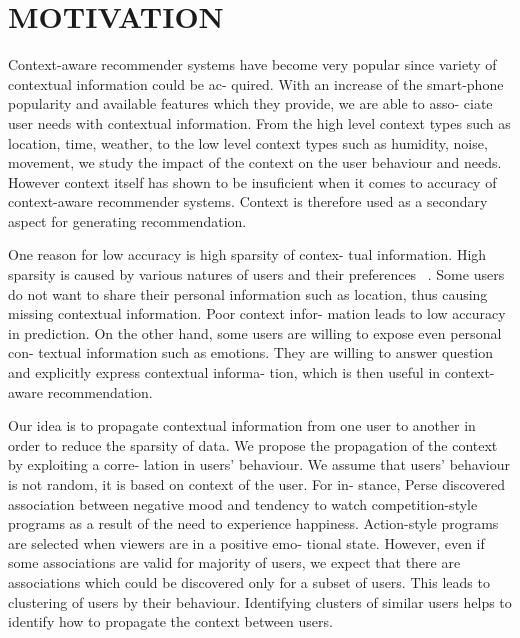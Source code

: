 \documentclass{acm_proc_article-sp}
\begin{document}



\section{MOTIVATION}
Context-aware recommender systems have become very
popular since variety of contextual information could be ac-
quired. With an increase of the smart-phone popularity and
available features which they provide, we are able to asso-
ciate user needs with contextual information. From the high
level context types such as location, time, weather, to the
low level context types such as humidity, noise, movement,
we study the impact of the context on the user behaviour and
needs. However context itself has shown to be insuficient
when it comes to accuracy of context-aware recommender
systems. Context is therefore used as a secondary aspect for
generating recommendation.

One reason for low accuracy is high sparsity of contex-
tual information. High sparsity is caused by various natures
of users and their preferences ~\cite{carlson2011wide}. Some users do not want
to share their personal information such as location, thus
causing missing contextual information. Poor context infor-
mation leads to low accuracy in prediction. On the other
hand, some users are willing to expose even personal con-
textual information such as emotions. They are willing to
answer question and explicitly express contextual informa-
tion, which is then useful in context-aware recommendation.

Our idea is to propagate contextual information from one
user to another in order to reduce the sparsity of data. We
propose the propagation of the context by exploiting a corre-
lation in users' behaviour. We assume that users' behaviour
is not random, it is based on context of the user. For in-
stance, Perse discovered association between negative
mood and tendency to watch competition-style programs as
a result of the need to experience happiness. Action-style
programs are selected when viewers are in a positive emo-
tional state. However, even if some associations are valid
for majority of users, we expect that there are associations
which could be discovered only for a subset of users. This
leads to clustering of users by their behaviour. Identifying
clusters of similar users helps to identify how to propagate
the context between users.
\end{document}
